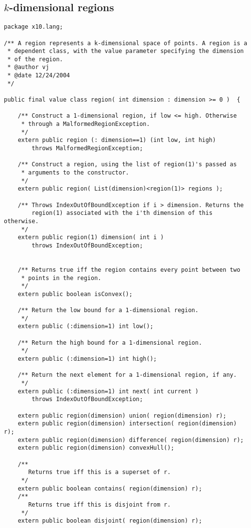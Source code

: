 \subsection{$k$-dimensional regions}
{\footnotesize
\begin{verbatim}
package x10.lang;

/** A region represents a k-dimensional space of points. A region is a
 * dependent class, with the value parameter specifying the dimension
 * of the region.
 * @author vj
 * @date 12/24/2004
 */

public final value class region( int dimension : dimension >= 0 )  {

    /** Construct a 1-dimensional region, if low <= high. Otherwise
     * through a MalformedRegionException.
     */
    extern public region (: dimension==1) (int low, int high)
        throws MalformedRegionException;

    /** Construct a region, using the list of region(1)'s passed as
     * arguments to the constructor.
     */
    extern public region( List(dimension)<region(1)> regions );

    /** Throws IndexOutOfBoundException if i > dimension. Returns the
        region(1) associated with the i'th dimension of this otherwise.
     */
    extern public region(1) dimension( int i )
        throws IndexOutOfBoundException;


    /** Returns true iff the region contains every point between two
     * points in the region.
     */
    extern public boolean isConvex();

    /** Return the low bound for a 1-dimensional region.
     */
    extern public (:dimension=1) int low();

    /** Return the high bound for a 1-dimensional region.
     */
    extern public (:dimension=1) int high();

    /** Return the next element for a 1-dimensional region, if any.
     */
    extern public (:dimension=1) int next( int current )
        throws IndexOutOfBoundException;

    extern public region(dimension) union( region(dimension) r);
    extern public region(dimension) intersection( region(dimension) r);
    extern public region(dimension) difference( region(dimension) r);
    extern public region(dimension) convexHull();

    /**
       Returns true iff this is a superset of r.
     */
    extern public boolean contains( region(dimension) r);
    /**
       Returns true iff this is disjoint from r.
     */
    extern public boolean disjoint( region(dimension) r);


\end{verbatim}}

